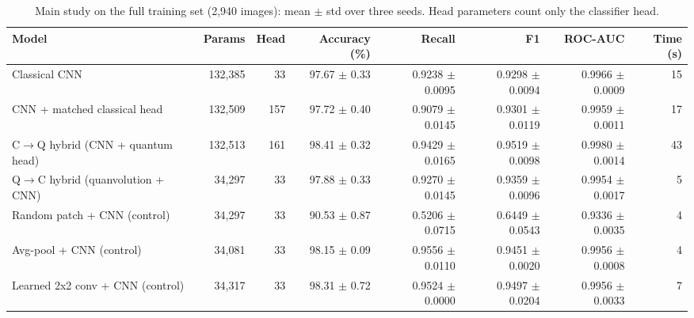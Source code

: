 \begin{table}[htbp]
\centering
\footnotesize
\caption{Main study on the full training set (2,940 images): mean $\pm$ std over three seeds. Head parameters count only the classifier head.}
\label{tab:study_full}
\begin{adjustbox}{max width=\linewidth}
\begin{tabular}{lrrrrrrr}
\toprule
Model & Params & Head & Accuracy (\%) & Recall & F1 & ROC-AUC & Time (s) \\
\midrule
Classical CNN & 132,385 & 33 & 97.67 $\pm$ 0.33 & 0.9238 $\pm$ 0.0095 & 0.9298 $\pm$ 0.0094 & 0.9966 $\pm$ 0.0009 & 15 \\
CNN + matched classical head & 132,509 & 157 & 97.72 $\pm$ 0.40 & 0.9079 $\pm$ 0.0145 & 0.9301 $\pm$ 0.0119 & 0.9959 $\pm$ 0.0011 & 17 \\
C$\rightarrow$Q hybrid (CNN + quantum head) & 132,513 & 161 & 98.41 $\pm$ 0.32 & 0.9429 $\pm$ 0.0165 & 0.9519 $\pm$ 0.0098 & 0.9980 $\pm$ 0.0014 & 43 \\
Q$\rightarrow$C hybrid (quanvolution + CNN) & 34,297 & 33 & 97.88 $\pm$ 0.33 & 0.9270 $\pm$ 0.0145 & 0.9359 $\pm$ 0.0096 & 0.9954 $\pm$ 0.0017 & 5 \\
Random patch + CNN (control) & 34,297 & 33 & 90.53 $\pm$ 0.87 & 0.5206 $\pm$ 0.0715 & 0.6449 $\pm$ 0.0543 & 0.9336 $\pm$ 0.0035 & 4 \\
Avg-pool + CNN (control) & 34,081 & 33 & 98.15 $\pm$ 0.09 & 0.9556 $\pm$ 0.0110 & 0.9451 $\pm$ 0.0020 & 0.9956 $\pm$ 0.0008 & 4 \\
Learned 2x2 conv + CNN (control) & 34,317 & 33 & 98.31 $\pm$ 0.72 & 0.9524 $\pm$ 0.0000 & 0.9497 $\pm$ 0.0204 & 0.9956 $\pm$ 0.0033 & 7 \\
\bottomrule
\end{tabular}
\end{adjustbox}
\end{table}
